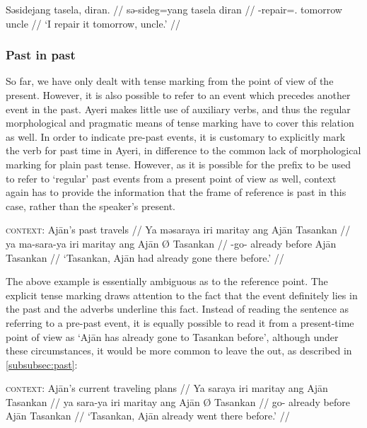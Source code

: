 \ex\begingl
	\gla Səsidejang tasela, diran. //
	\glb sə-sideg=yang tasela diran //
	\glc \Fut{}-repair=\Fsg{}.\Aarg{} tomorrow uncle //
	\glft `I  repair it tomorrow, uncle.' //
\endgl\xe


\subsubsection{Past in past}

So far, we have only dealt with tense marking from the point of view of the
present. However, it is also possible to refer to an event which precedes
another event in the past. Ayeri makes little use of auxiliary verbs, and thus
the regular morphological and pragmatic means of tense marking have to cover
this relation as well. In order to indicate pre-past events, it is customary to
explicitly mark the verb for past time in Ayeri, in difference to the common
lack of morphological marking for plain past tense. However, as it is possible
for the  prefix to be used to refer to `regular' past events from
a present point of view as well, context again has to provide the information
that the frame of reference is past in this case, rather than the speaker's
present.

\ex
\begingl
	\glpreamble \textsc{context:} Ajān's past travels //
	\gla Ya məsaraya iri maritay ang Ajān {} Tasankan //
	\glb ya ma-sara-ya iri maritay ang Ajān Ø Tasankan //
	\glc \LocT{} \Pst{}-go-\TsgM{} already before \Aarg{} Ajān \Top{} %
		Tasankan //
	\glft `Tasankan, Ajān had already gone there before.' //
\endgl
\xe

The above example is essentially ambiguous as to the reference point. The
explicit tense marking draws attention to the fact that the event definitely
lies in the past and the adverbs underline this fact. Instead of reading the
sentence as referring to a pre-past event, it is equally possible to read it
from a present-time point of view as `Ajān has already gone to Tasankan
before', although under these circumstances, it would be more common to leave
the  out, as described in \autoref{subsubsec:past}:

\ex
\begingl
	\glpreamble \textsc{context:} Ajān's current traveling plans //
	\gla Ya saraya iri maritay ang Ajān {} Tasankan //
	\glb ya sara-ya iri maritay ang Ajān Ø Tasankan //
	\glc \LocT{} go-\TsgM{} already before \Aarg{} Ajān \Top{} %
		Tasankan //
	\glft `Tasankan, Ajān already went there before.' //
\endgl
\xe

